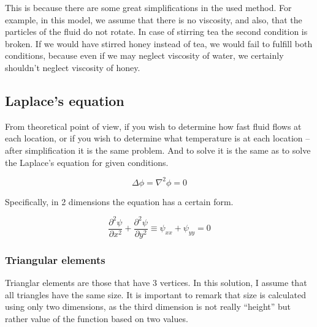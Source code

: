 \documentclass[a4paper,12pt]{article}
\begin{document}

This is because there are some great simplifications in the used method. For example, in this model, we assume that
there is no viscosity, and also, that the particles of the fluid do not rotate. In case of stirring tea the second
condition is broken. If we would have stirred honey instead of tea, we would fail to fulfill both conditions, because
even if we may neglect viscosity of water, we certainly shouldn't neglect viscosity of honey.

\subsection{Laplace's equation}

From theoretical point of view, if you wish to determine how fast fluid flows at each location, or if you wish to
determine what temperature is at each location -- after simplification it is the same problem. And to solve it is the
same as to solve the Laplace's equation for given conditions. \cite{wiki_laplaces_equation}

\[ \Delta \phi =  \nabla^2 \phi = 0 \]

Specifically, in 2 dimensions the equation has a certain form.

\[ \frac{\partial^2 \psi}{\partial x^2} + \frac{\partial^2 \psi}{\partial y^2} \equiv \psi_{xx} + \psi_{yy} = 0 \]


\subsubsection{Triangular elements}

Trianglar elements are those that have 3 vertices. In this solution, I assume that all triangles have the same size. It
is important to remark that size is calculated using only two dimensions, as the third dimension is not really
``height'' but rather value of the function based on two values.
\end{document}
